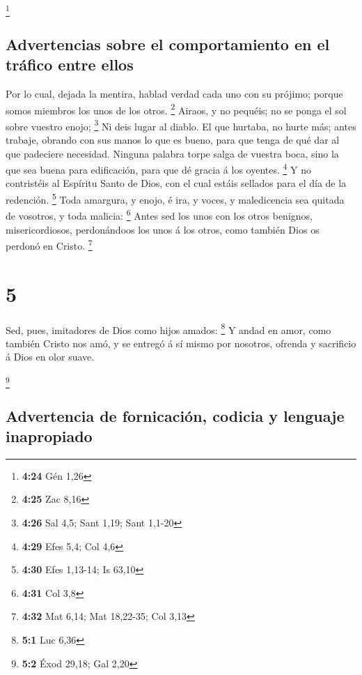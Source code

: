 \footnote{\textbf{4:24} Gén 1,26}

\hypertarget{advertencias-sobre-el-comportamiento-en-el-truxe1fico-entre-ellos}{%
\subsection{Advertencias sobre el comportamiento en el tráfico entre
ellos}\label{advertencias-sobre-el-comportamiento-en-el-truxe1fico-entre-ellos}}

 Por lo cual, dejada la mentira, hablad verdad cada uno con
su prójimo; porque somos miembros los unos de los otros. \footnote{\textbf{4:25}
  Zac 8,16}  Airaos, y no pequéis; no se ponga el sol sobre
vuestro enojo; \footnote{\textbf{4:26} Sal 4,5; Sant 1,19; Sant 1,1-20}
 Ni deis lugar al diablo.  El que hurtaba, no
hurte más; antes trabaje, obrando con sus manos lo que es bueno, para
que tenga de qué dar al que padeciere necesidad.  Ninguna
palabra torpe salga de vuestra boca, sino la que sea buena para
edificación, para que dé gracia á los oyentes. \footnote{\textbf{4:29}
  Efes 5,4; Col 4,6}  Y no contristéis al Espíritu Santo de
Dios, con el cual estáis sellados para el día de la redención.
\footnote{\textbf{4:30} Efes 1,13-14; Is 63,10}  Toda
amargura, y enojo, é ira, y voces, y maledicencia sea quitada de
vosotros, y toda malicia: \footnote{\textbf{4:31} Col 3,8} 
Antes sed los unos con los otros benignos, misericordiosos, perdonándoos
los unos á los otros, como también Dios os perdonó en Cristo.
\footnote{\textbf{4:32} Mat 6,14; Mat 18,22-35; Col 3,13}

\hypertarget{section-4}{%
\section{5}\label{section-4}}

 Sed, pues, imitadores de Dios como hijos amados:
\footnote{\textbf{5:1} Luc 6,36}  Y andad en amor, como
también Cristo nos amó, y se entregó á sí mismo por nosotros, ofrenda y
sacrificio á Dios en olor suave.

\footnote{\textbf{5:2} Éxod 29,18; Gal 2,20}

\hypertarget{advertencia-de-fornicaciuxf3n-codicia-y-lenguaje-inapropiado}{%
\subsection{Advertencia de fornicación, codicia y lenguaje
inapropiado}\label{advertencia-de-fornicaciuxf3n-codicia-y-lenguaje-inapropiado}}

